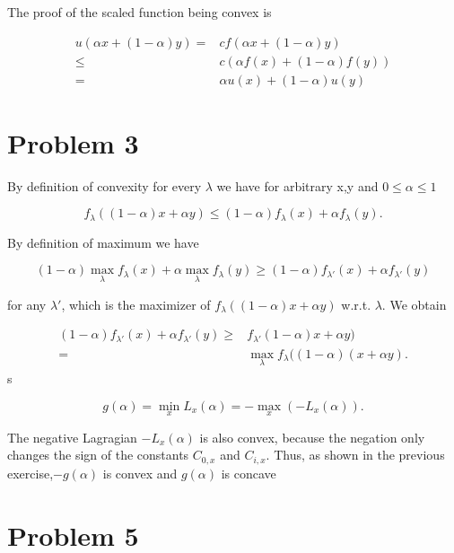 \documentclass[12pt]{article}
\begin{document}
The proof of the scaled function being convex is

\begin{align}
u(\alpha x + (1-\alpha)y) =& cf(\alpha x + (1-\alpha)y)\\
\leq& c\left(\alpha f(x) +(1-\alpha)f(y)\right)\\
=& \alpha u(x) +(1-\alpha)u(y)
\end{align}

\section*{Problem 3}

By definition of convexity for every $\lambda$ we have for arbitrary x,y and $0\leq\alpha\leq1$

\begin{equation}
f_\lambda((1-\alpha)x + \alpha y) \leq (1-\alpha)f_\lambda(x) + \alpha f_\lambda(y).
\end{equation}

By definition of maximum we have

\begin{equation}
(1-\alpha)\max\limits_{\lambda}f_\lambda(x) + \alpha \max\limits_{\lambda}f_\lambda(y) \geq (1-\alpha)f_{\lambda '}(x) + \alpha f_{\lambda '}(y)
\end{equation}

for any $\lambda '$, which is the maximizer of $f_\lambda((1-\alpha)x + \alpha y)$ w.r.t. $\lambda$. We obtain

\begin{align}
(1-\alpha)f_{\lambda '}(x) + \alpha f_{\lambda '}(y) \geq& f_{\lambda '}(1-\alpha)x + \alpha y)\\
=& \max\limits_{\lambda}f_\lambda((1-\alpha)(x + \alpha y).
\end{align}s

\begin{equation}
g(\alpha) = \min\limits_{x}L_x(\alpha) = -\max\limits_{x}(-L_x(\alpha)).
\end{equation}

The negative Lagragian $-L_x(\alpha)$ is also convex, because the negation only changes the sign of the
constants $C_{0,x}$ and $C_{i,x}$. Thus, as shown in the previous exercise,$-g(\alpha)$ is convex and $g(\alpha)$ is concave

\section*{Problem 5}
\end{document}
